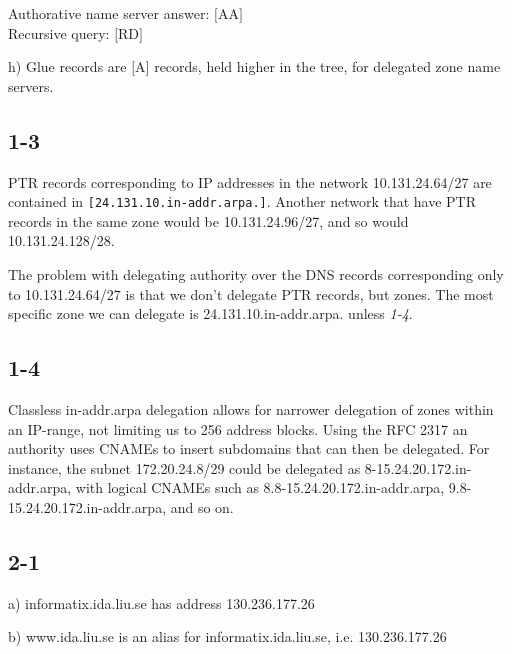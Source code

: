   Authorative name server answer: $[$AA$]$\\
  Recursive query: $[$RD$]$

h) Glue records are $[$A$]$ records, held higher in the tree, for delegated zone name servers.

\subsection{1-3}
PTR records corresponding to IP addresses in the network 10.131.24.64/27 are contained in \verb=[24.131.10.in-addr.arpa.]=. Another network that have PTR records in the same zone would be 10.131.24.96/27, and so would 10.131.24.128/28.

The problem with delegating authority over the DNS records corresponding only to 10.131.24.64/27 is that we don't delegate PTR records, but zones. The most specific zone we can delegate is 24.131.10.in-addr.arpa. unless \emph{1-4}.

\subsection{1-4}
Classless in-addr.arpa delegation allows for narrower delegation of zones within an IP-range, not limiting us to 256 address blocks. Using the RFC 2317 an authority uses CNAMEs to insert subdomains that can then be delegated. For instance, the subnet 172.20.24.8/29 could be delegated as 8-15.24.20.172.in-addr.arpa, with logical CNAMEs such as 8.8-15.24.20.172.in-addr.arpa, 9.8-15.24.20.172.in-addr.arpa, and so on.

\subsection{2-1}

a) informatix.ida.liu.se has address 130.236.177.26

b) www.ida.liu.se is an alias for informatix.ida.liu.se, i.e. 130.236.177.26

